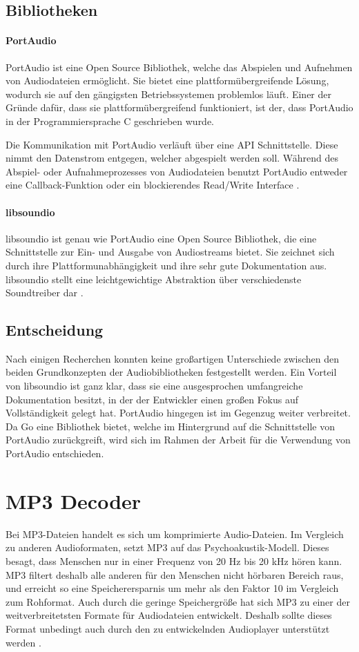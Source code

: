 \subsection{Bibliotheken}
\paragraph{PortAudio}
PortAudio ist eine Open Source Bibliothek, welche das Abspielen und Aufnehmen
von Audiodateien ermöglicht. Sie bietet eine plattformübergreifende Lösung,
wodurch sie auf den gängigsten Betriebssystemen problemlos läuft. Einer der
Gründe dafür, dass sie plattformübergreifend funktioniert, ist der, dass
PortAudio in der Programmiersprache C geschrieben wurde. \hfill

Die Kommunikation mit PortAudio verläuft über eine \ac{API} Schnittstelle.
Diese nimmt den Datenstrom entgegen, welcher abgespielt werden soll. Während
des Abspiel- oder Aufnahmeprozesses von Audiodateien benutzt PortAudio entweder
eine Callback-Funktion oder ein blockierendes Read/Write Interface
\autocite{PortAudio_2019}.

\paragraph{libsoundio}
libsoundio ist genau wie PortAudio eine Open Source Bibliothek, die eine
Schnittstelle zur Ein- und Ausgabe von Audiostreams bietet. Sie zeichnet
sich durch ihre Plattformunabhängigkeit und ihre sehr gute Dokumentation aus.
libsoundio stellt eine leichtgewichtige Abstraktion über verschiedenste
Soundtreiber dar \autocite{libsoundio_2019}.

\subsection{Entscheidung}
Nach einigen Recherchen konnten keine großartigen Unterschiede zwischen den
beiden Grundkonzepten der Audiobibliotheken festgestellt werden. Ein Vorteil von
libsoundio ist ganz klar, dass sie eine ausgesprochen umfangreiche
Dokumentation besitzt, in der der Entwickler einen großen Fokus auf
Vollständigkeit gelegt hat. PortAudio hingegen ist im Gegenzug weiter verbreitet.
Da Go eine Bibliothek bietet, welche im Hintergrund auf die Schnittstelle
von PortAudio zurückgreift, wird sich im Rahmen der Arbeit für die
Verwendung von PortAudio entschieden.

\section{MP3 Decoder}
Bei \ac{MP3}-Dateien handelt es sich um komprimierte Audio-Dateien. Im
Vergleich zu anderen Audioformaten, setzt \ac{MP3} auf das
Psychoakustik-Modell. Dieses besagt, dass Menschen nur in einer Frequenz von 20
Hz bis 20 kHz hören kann. \ac{MP3} filtert deshalb alle anderen für den
Menschen nicht hörbaren Bereich raus, und erreicht so eine Speicherersparnis um
mehr als den Faktor 10 im Vergleich zum Rohformat. Auch durch die geringe
Speichergröße hat sich \ac{MP3} zu einer der weitverbreitetsten Formate für
Audiodateien entwickelt.  Deshalb sollte dieses Format unbedingt auch durch den
zu entwickelnden Audioplayer unterstützt werden \autocite{mp3}. \hfill

